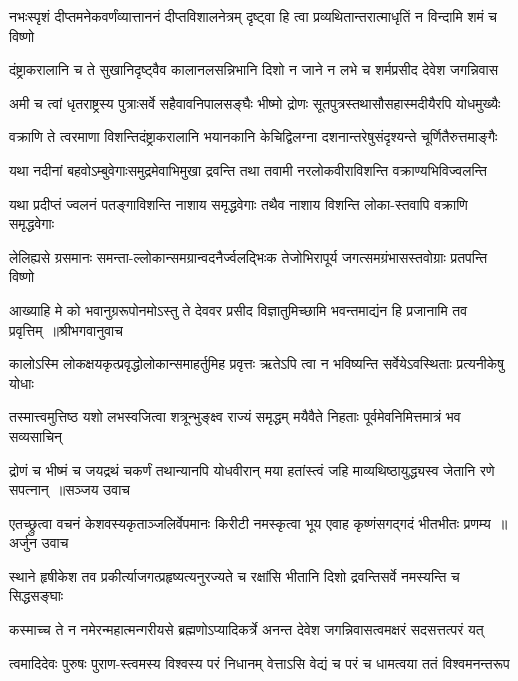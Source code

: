 \twolineshloka
{नभःस्पृशं दीप्तमनेकवर्णंव्यात्ताननं दीप्तविशालनेत्रम्}
{दृष्ट्वा हि त्वा प्रव्यथितान्तरात्माधृतिं न विन्दामि शमं च विष्णो}


\twolineshloka
{दंष्ट्राकरालानि च ते सुखानिदृष्ट्वैव कालानलसन्निभानि}
{दिशो न जाने न लभे च शर्मप्रसीद देवेश जगन्निवास}


\twolineshloka
{अमी च त्वां धृतराष्ट्रस्य पुत्राःसर्वे सहैवावनिपालसङ्घैः}
{भीष्मो द्रोणः सूतपुत्रस्तथासौसहास्मदीयैरपि योधमुख्यैः}


\twolineshloka
{वक्राणि ते त्वरमाणा विशन्तिदंष्ट्राकरालानि भयानकानि}
{केचिद्विलग्ना दशनान्तरेषुसंदृश्यन्ते चूर्णितैरुत्तमाङ्गैः}


\twolineshloka
{यथा नदीनां बहवोऽम्बुवेगाःसमुद्रमेवाभिमुखा द्रवन्ति}
{तथा तवामी नरलोकवीराविशन्ति वक्राण्यभिविज्वलन्ति}


\twolineshloka
{यथा प्रदीप्तं ज्वलनं पतङ्गाविशन्ति नाशाय समृद्धवेगाः}
{तथैव नाशाय विशन्ति लोका-स्तवापि वक्राणि समृद्धवेगाः}


\twolineshloka
{लेलिह्यसे ग्रसमानः समन्ता-ल्लोकान्समग्रान्वदनैर्ज्वलद्भिःक}
{तेजोभिरापूर्य जगत्समग्रंभासस्तवोग्राः प्रतपन्ति विष्णो}


\threelineshloka
{आख्याहि मे को भवानुग्ररूपोनमोऽस्तु ते देववर प्रसीद}
{विज्ञातुमिच्छामि भवन्तमाद्यंन हि प्रजानामि तव प्रवृत्तिम् ॥श्रीभगवानुवाच}
{}


\twolineshloka
{कालोऽस्मि लोकक्षयकृत्प्रवृद्धोलोकान्समाहर्तुमिह प्रवृत्तः}
{ऋतेऽपि त्वा न भविष्यन्ति सर्वेयेऽवस्थिताः प्रत्यनीकेषु योधाः}


\twolineshloka
{तस्मात्त्वमुत्तिष्ठ यशो लभस्वजित्वा शत्रून्भुङ्क्ष्व राज्यं समृद्धम्}
{मयैवैते निहताः पूर्वमेवनिमित्तमात्रं भव सव्यसाचिन्}


\threelineshloka
{द्रोणं च भीष्मं च जयद्रथं चकर्णं तथान्यानपि योधवीरान्}
{मया हतांस्त्वं जहि माव्यथिष्ठायुद्ध्यस्व जेतानि रणे सपत्नान् ॥सञ्जय उवाच}
{}


\threelineshloka
{एतच्छ्रुत्वा वचनं केशवस्यकृताञ्जलिर्वेपमानः किरीटी}
{नमस्कृत्वा भूय एवाह कृष्णंसगद्गदं भीतभीतः प्रणम्य ॥अर्जुन उवाच}
{}


\twolineshloka
{स्थाने हृषीकेश तव प्रकीर्त्याजगत्प्रहृष्यत्यनुरज्यते च}
{रक्षांसि भीतानि दिशो द्रवन्तिसर्वे नमस्यन्ति च सिद्धसङ्घाः}


\twolineshloka
{कस्माच्च ते न नमेरन्महात्मन्गरीयसे ब्रह्मणोऽप्यादिकर्त्रे}
{अनन्त देवेश जगन्निवासत्वमक्षरं सदसत्तत्परं यत्}


\twolineshloka
{त्वमादिदेवः पुरुषः पुराण-स्त्वमस्य विश्वस्य परं निधानम्}
{वेत्ताऽसि वेद्यं च परं च धामत्वया ततं विश्वमनन्तरूप}


